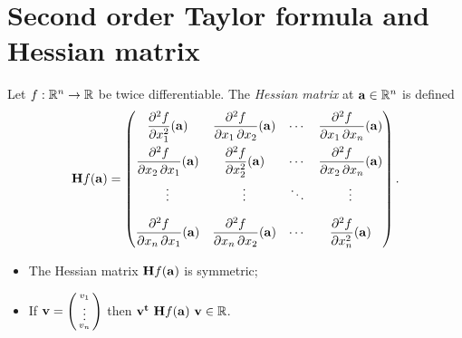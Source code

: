 \section{Second order Taylor formula and Hessian matrix}


\begin{definition}
    Let \(f:\bR^n \to\bR\) be twice differentiable.
    The \emph{Hessian matrix} at \(\aa\in \bR^n\) is defined
    \[
        \mathbf{H} f (\aa)= \begin{pmatrix}
            \dfrac{\partial^2 f}{\partial x_1^2} (\aa)
             & \dfrac{\partial^2 f}{\partial x_1\,\partial x_2} (\aa)
             & \cdots
             & \dfrac{\partial^2 f}{\partial x_1\,\partial x_n}(\aa)  \\[2.2ex]
            \dfrac{\partial^2 f}{\partial x_2\,\partial x_1} (\aa)
             & \dfrac{\partial^2 f}{\partial x_2^2}(\aa)
             & \cdots
             & \dfrac{\partial^2 f}{\partial x_2\,\partial x_n}(\aa)  \\[2.2ex]
            \vdots
             & \vdots
             & \ddots
             & \vdots                                                 \\[2.2ex]
            \dfrac{\partial^2 f}{\partial x_n\,\partial x_1} (\aa)
             & \dfrac{\partial^2 f}{\partial x_n\,\partial x_2} (\aa)
             & \cdots
             & \dfrac{\partial^2 f}{\partial x_n^2}(\aa)
        \end{pmatrix}.
    \]
\end{definition}



\begin{itemize}
    \item The Hessian matrix \(\mathbf{H} f (\aa)\) is symmetric;
\end{itemize}

\begin{itemize}
    \item If \(\vv= \left( \begin{smallmatrix}
                  v_1\\ \vdots \\v_n
              \end{smallmatrix} \right)  \) then \(\vv^{\mathbf{t}} \ \mathbf{H} f (\aa) \ \vv \in \bR\).
\end{itemize}







